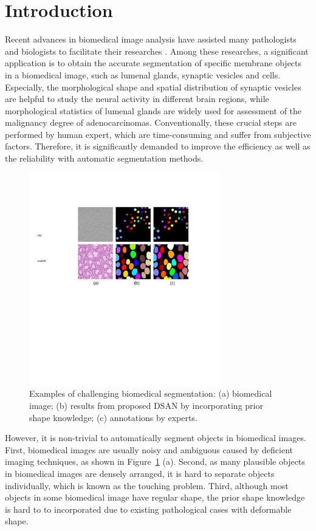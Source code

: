 \section{Introduction}
Recent advances in biomedical image analysis have assisted many pathologists and biologists to facilitate their researches \cite{Chen2016b, Ronneberger2015,Chen2016c,Lieman-Sifry2017,Paszke2016,Tseng2017,Sirinukunwattana2015b}.
Among these researches, a significant application is to obtain the accurate segmentation of specific membrane objects in a biomedical image, such as lumenal glands, synaptic vesicles and cells.
Especially, the morphological shape and spatial distribution of synaptic vesicles are helpful to study the neural activity in different brain regions, while morphological statistics of lumenal glands are widely used for assessment of the malignancy degree of adenocarcinomas.
Conventionally, these crucial steps are performed by human expert, which are time-consuming and suffer from subjective factors.
Therefore, it is significantly demanded to improve the efficiency as well as the reliability with automatic segmentation methods.

\begin{figure}
    \begin{center}
        \includegraphics[width=3.3in]{figures/FigImg.pdf}
    \end{center}
    \caption{Examples of challenging biomedical segmentation: (a) biomedical image; (b) results from proposed DSAN by incorporating prior shape knowledge; (c) annotations by experts.}
    \label{FigImgs}
\end{figure}

However, it is non-trivial to automatically segment objects in biomedical images.
First, biomedical images are usually noisy and ambiguous caused by deficient imaging techniques, as shown in Figure~\ref{FigImgs} (a).
Second, as many plausible objects in biomedical images are densely arranged, it is hard to separate objects individually, which is known as the touching problem.
Third, although most objects in some biomedical image have regular shape, the prior shape knowledge is hard to to incorporated due to existing pathological cases with deformable shape\cite{Sirinukunwattana2015b}.

